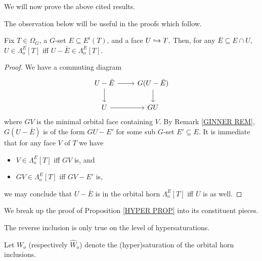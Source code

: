 \documentclass[a4paper,10pt,draft]{article}%
\begin{document}
We will now prove the above cited results.

The observation below will be useful in the proofs which follow.
\begin{lemma}
      \label{FOF_OHORN_LEM}
      Fix $T \in \Omega_G$, a $G$-set $E \subseteq E^i(T)$, and a face $U \hookrightarrow T$.
      Then, for any $\bar E \subseteq E \cap U$,
      $U \in \Lambda^{E}_o[T]$ iff $U - \bar E \in \Lambda^{E}_o[T]$. 
\end{lemma}
\begin{proof}
      We have a commuting diagram
      \begin{equation}
            \begin{tikzcd}
                  U - \bar E \arrow[r] \arrow[d]
                  &
                  G (U - \bar E) \arrow[d]
                  \\
                  U\arrow[r]
                  &
                  G U
            \end{tikzcd}
      \end{equation}
      where $G V$ is the minimal orbital face containing $V$.
      By Remark \ref{GINNER REM}, $G(U - \bar E)$ is of the form $GU - E'$
      for some sub $G$-set $E' \subseteq E$.
      It is immediate that for any face $V$ of $T$ we have
      \begin{itemize}
      \item $V \in \Lambda^{E}_o[T]$ iff $G V$ is, and
      \item $G V \in \Lambda^{E}_o[T]$ iff $G V - E'$ is,
      \end{itemize}
      we may conclude that
      $U - \bar E$ is in the orbital horn $\Lambda^{E}_o[T]$
      iff
      $U$ is as well.
\end{proof}

We break up the proof of Proposition \ref{HYPER PROP} into its constituent pieces.


The reverse inclusion is only true on the level of hypersaturations.

\begin{definition}
      Let $W_o$ (respectively $\hat{W}_o$) denote the (hyper)saturation of the orbital horn inclusions.
\end{definition}
\end{document}
